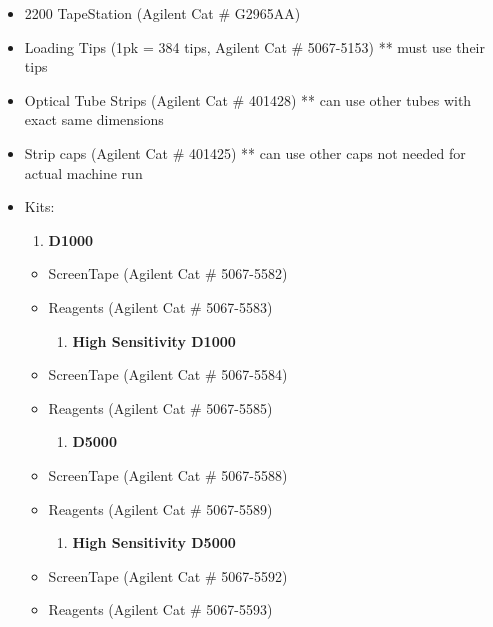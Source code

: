 \documentclass[
  letterpaper,
  DIV=11,
  numbers=noendperiod]{scrreprt}
\providecommand{\tightlist}{%
  \setlength{\itemsep}{0pt}\setlength{\parskip}{0pt}}\usepackage{longtable,booktabs,array}
\begin{document}
\begin{itemize}
\item
  2200 TapeStation (Agilent Cat \# G2965AA)
\item
  Loading Tips (1pk = 384 tips, Agilent Cat \# 5067-5153) ** must use
  their tips
\item
  Optical Tube Strips (Agilent Cat \# 401428) ** can use other tubes
  with exact same dimensions
\item
  Strip caps (Agilent Cat \# 401425) ** can use other caps not needed
  for actual machine run
\item
  Kits:

  \begin{enumerate}
  \def\labelenumi{\arabic{enumi}.}
  \tightlist
  \item
    \textbf{D1000}
  \end{enumerate}

  \begin{itemize}
  \item
    ScreenTape (Agilent Cat \# 5067-5582)
  \item
    Reagents (Agilent Cat \# 5067-5583)

    \begin{enumerate}
    \def\labelenumi{\arabic{enumi}.}
    \tightlist
    \item
      \textbf{High Sensitivity D1000}
    \end{enumerate}
  \item
    ScreenTape (Agilent Cat \# 5067-5584)
  \item
    Reagents (Agilent Cat \# 5067-5585)

    \begin{enumerate}
    \def\labelenumi{\arabic{enumi}.}
    \tightlist
    \item
      \textbf{D5000}
    \end{enumerate}
  \item
    ScreenTape (Agilent Cat \# 5067-5588)
  \item
    Reagents (Agilent Cat \# 5067-5589)

    \begin{enumerate}
    \def\labelenumi{\arabic{enumi}.}
    \tightlist
    \item
      \textbf{High Sensitivity D5000}
    \end{enumerate}
  \item
    ScreenTape (Agilent Cat \# 5067-5592)
  \item
    Reagents (Agilent Cat \# 5067-5593)
  \end{itemize}
\end{itemize}
\end{document}
